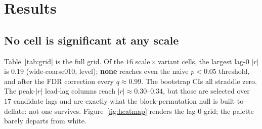 \documentclass[11pt,a4paper]{article}
\begin{document}
\section{Results}
\label{sec:results}

\subsection{No cell is significant at any scale}
Table~\ref{tab:grid} is the full grid. Of the $16$ scale\,$\times$\,variant cells, the largest
lag-0 $|r|$ is $0.19$ (\textsf{wide-coarse010, level}); \textbf{none} reaches even the naive
$p<0.05$ threshold, and after the FDR correction every $q\approx0.99$. The bootstrap CIs all
straddle zero. The peak-$|r|$ lead-lag columns reach $|r|\!\approx\!0.30$--$0.34$, but those are
selected over $17$ candidate lags and are exactly what the block-permutation null is built to
deflate: not one survives. Figure~\ref{fig:heatmap} renders the lag-0 grid; the palette barely
departs from white.
\end{document}
